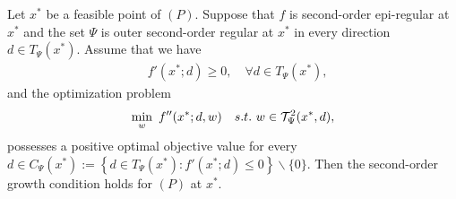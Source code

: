 \documentclass[10pt,a4paper]{amsart}
\begin{document}
\begin{theorem}\label{thm SOSC for
nonsmooth}
Let $x^*$ be a feasible point of $(P)$. Suppose that $f$ is  %
    second-order
 epi-regular at $x^*$ and the set $\Psi$ is outer second-order regular at $x^*$ in every direction  $d\in T_{\Psi}(x^*)$.
 Assume that  we have
 \begin{align}\label{thm f' ge 0}
   & f'(x^*;d)\ge 0, \quad \forall d\in T_{\Psi}(x^*),
 \end{align}
 and  the optimization problem
   \begin{align}\label{thm p f''}
    \min_{w}~ f''(x^*;d,w) ~~~{\rm s.t.}~w\in \mathcal{T}_{\Psi}^2(x^*,d),
   \end{align}
possesses a positive optimal objective value for every $d\in C_{\Psi}(x^*):=\left\{d\in T_{\Psi}(x^*): f'(x^*;d)\le
   0\right\}  \backslash \{0\}$. Then the
second-order growth condition holds for $(P)$ at $x^*$.
\end{theorem}
\end{document}
